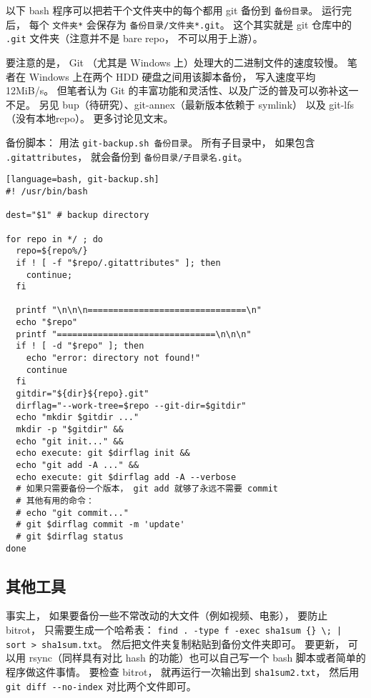 
\begin{issues}
\issueDraft
\end{issues}


以下 bash 程序可以把若干个文件夹中的每个都用 git 备份到 \verb|备份目录|。 运行完后， 每个 \verb|文件夹*| 会保存为 \verb|备份目录/文件夹*.git|。 这个其实就是 git 仓库中的 \verb|.git| 文件夹（注意并不是 bare repo， 不可以用于上游）。

要注意的是， Git （尤其是 Windows 上）处理大的二进制文件的速度较慢。 笔者在 Windows 上在两个 HDD 硬盘之间用该脚本备份， 写入速度平均 12MiB/s。 但笔者认为 Git 的丰富功能和灵活性、以及广泛的普及可以弥补这一不足。 另见 bup（待研究）、git-annex（最新版本依赖于 symlink） 以及 git-lfs（没有本地repo）。 更多讨论见文末。

备份脚本： 用法 \verb|git-backup.sh 备份目录|。 所有子目录中， 如果包含 \verb|.gitattributes|， 就会备份到 \verb|备份目录/子目录名.git|。
\begin{lstlisting}[language=bash, git-backup.sh]
#! /usr/bin/bash

dest="$1" # backup directory

for repo in */ ; do
  repo=${repo%/}
  if ! [ -f "$repo/.gitattributes" ]; then
    continue;
  fi

  printf "\n\n\n===============================\n"
  echo "$repo"
  printf "===============================\n\n\n"
  if ! [ -d "$repo" ]; then
    echo "error: directory not found!"
    continue
  fi
  gitdir="${dir}${repo}.git"
  dirflag="--work-tree=$repo --git-dir=$gitdir"
  echo "mkdir $gitdir ..."
  mkdir -p "$gitdir" &&
  echo "git init..." &&
  echo execute: git $dirflag init &&
  echo "git add -A ..." &&
  echo execute: git $dirflag add -A --verbose
  # 如果只需要备份一个版本， git add 就够了永远不需要 commit
  # 其他有用的命令：
  # echo "git commit..."
  # git $dirflag commit -m 'update'
  # git $dirflag status
done
\end{lstlisting}

\subsection{其他工具}
事实上， 如果要备份一些不常改动的大文件（例如视频、电影）， 要防止 bitrot， 只需要生成一个哈希表： \verb`find . -type f -exec sha1sum {} \; | sort > sha1sum.txt`。 然后把文件夹复制粘贴到备份文件夹即可。 要更新， 可以用 rsync（同样具有对比 hash 的功能）也可以自己写一个 bash 脚本或者简单的程序做这件事情。 要检查 bitrot， 就再运行一次输出到 \verb|sha1sum2.txt|， 然后用 \verb|git diff --no-index| 对比两个文件即可。

